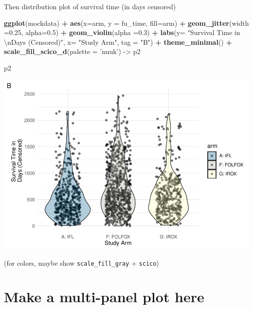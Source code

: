 \documentclass[fleqn,10pt,lineno]{wlpeerj} %
\newenvironment{Shaded}{\begin{snugshade}}{\end{snugshade}}
\newcommand{\CharTok}[1]{\textcolor[rgb]{0.31,0.60,0.02}{#1}}
\newcommand{\DataTypeTok}[1]{\textcolor[rgb]{0.13,0.29,0.53}{#1}}
\newcommand{\FloatTok}[1]{\textcolor[rgb]{0.00,0.00,0.81}{#1}}
\newcommand{\KeywordTok}[1]{\textcolor[rgb]{0.13,0.29,0.53}{\textbf{#1}}}
\newcommand{\NormalTok}[1]{#1}
\newcommand{\OperatorTok}[1]{\textcolor[rgb]{0.81,0.36,0.00}{\textbf{#1}}}
\newcommand{\StringTok}[1]{\textcolor[rgb]{0.31,0.60,0.02}{#1}}
\begin{document}
Then distribution plot of survival time (in days censored)

\begin{Shaded}
\begin{Highlighting}[]
\KeywordTok{ggplot}\NormalTok{(mockdata) }\OperatorTok{+}
\StringTok{  }\KeywordTok{aes}\NormalTok{(}\DataTypeTok{x=}\NormalTok{arm, }\DataTypeTok{y =}\NormalTok{ fu_time, }\DataTypeTok{fill=}\NormalTok{arm) }\OperatorTok{+}
\StringTok{  }\KeywordTok{geom_jitter}\NormalTok{(}\DataTypeTok{width =}\FloatTok{0.25}\NormalTok{, }\DataTypeTok{alpha=}\FloatTok{0.5}\NormalTok{) }\OperatorTok{+}
\StringTok{  }\KeywordTok{geom_violin}\NormalTok{(}\DataTypeTok{alpha =}\FloatTok{0.3}\NormalTok{) }\OperatorTok{+}
\StringTok{  }\KeywordTok{labs}\NormalTok{(}\DataTypeTok{y=} \StringTok{"Survival Time in }\CharTok{\textbackslash{}n}\StringTok{Days (Censored)"}\NormalTok{, }\DataTypeTok{x=} \StringTok{"Study Arm"}\NormalTok{, }\DataTypeTok{tag =} \StringTok{"B"}\NormalTok{) }\OperatorTok{+}
\StringTok{  }\KeywordTok{theme_minimal}\NormalTok{() }\OperatorTok{+}
\StringTok{  }\KeywordTok{scale_fill_scico_d}\NormalTok{(}\DataTypeTok{palette =} \StringTok{'nuuk'}\NormalTok{) ->}
\NormalTok{p2}

\NormalTok{p2}
\end{Highlighting}
\end{Shaded}

\includegraphics{04-paper_files/figure-latex/unnamed-chunk-8-1.pdf}

(for colors, maybe show \texttt{scale\_fill\_gray} + \texttt{scico})

\hypertarget{make-a-multi-panel-plot-here}{%
\section{Make a multi-panel plot here}\label{make-a-multi-panel-plot-here}}
\end{document}

